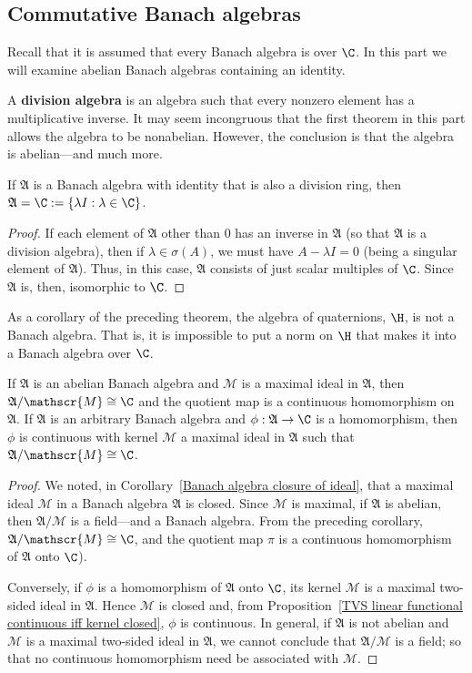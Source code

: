 \subsection{Commutative Banach algebras}
Recall that it is assumed that every Banach algebra is over $\C$. In this part we will examine abelian Banach algebras containing an identity.\par
A \textbf{division algebra} is an algebra such that every nonzero element has a multiplicative inverse. It may seem incongruous that the first theorem in this part allows the algebra to be nonabelian. However, the conclusion is that the algebra is abelian---and much more.
\begin{theorem}
If $\mathfrak{A}$ is a Banach algebra with identity that is also a division ring, then $\mathfrak{A}=\C:=\{\lambda I:\lambda\in\C\}$.
\end{theorem}
\begin{proof}
If each element of $\mathfrak{A}$ other than $0$ has an inverse in $\mathfrak{A}$ (so that $\mathfrak{A}$ is a division algebra), then if $\lambda\in\sigma(A)$, we must have $A-\lambda I=0$ (being a singular element of $\mathfrak{A}$). Thus, in this case, $\mathfrak{A}$ consists of just scalar multiples of $\C$. Since $\mathfrak{A}$ is, then, isomorphic to $\C$.
\end{proof}
As a corollary of the preceding theorem, the algebra of quaternions, $\H$, is not a Banach algebra. That is, it is impossible to put a norm on $\H$ that makes it into a Banach algebra over $\C$.
\begin{proposition}\label{Banach algebran abelian maximal ideal}
If $\mathfrak{A}$ is an abelian Banach algebra and $\mathscr{M}$ is a maximal ideal in $\mathfrak{A}$, then $\mathfrak{A}/\mathscr{M}\cong\C$ and the quotient map is a continuous homomorphism on $\mathfrak{A}$. If $\mathfrak{A}$ is an arbitrary Banach algebra and $\phi:\mathfrak{A}\to\C$ is a homomorphism, then $\phi$ is continuous with kernel $\mathscr{M}$ a maximal ideal in $\mathfrak{A}$ such that $\mathfrak{A}/\mathscr{M}\cong\C$.
\end{proposition}
\begin{proof}
We noted, in Corollary~\ref{Banach algebra closure of ideal}, that a maximal ideal $\mathscr{M}$ in a Banach algebra $\mathfrak{A}$ is closed. Since $\mathscr{M}$ is maximal, if $\mathfrak{A}$ is abelian, then $\mathfrak{A}/\mathscr{M}$ is a field---and a Banach algebra. From the preceding corollary, $\mathfrak{A}/\mathscr{M}\cong\C$, and the quotient map $\pi$ is a continuous homomorphism of $\mathfrak{A}$ onto $\C$).\par
Conversely, if $\phi$ is a homomorphism of $\mathfrak{A}$ onto $\C$, its kernel $\mathscr{M}$ is a maximal two-sided ideal in $\mathfrak{A}$. Hence $\mathscr{M}$ is closed and, from Proposition~\ref{TVS linear functional continuous iff kernel closed}, $\phi$ is continuous. In general, if $\mathfrak{A}$ is not abelian and $\mathscr{M}$ is a maximal two-sided ideal in $\mathfrak{A}$, we cannot conclude that $\mathfrak{A}/\mathscr{M}$ is a field; so that no continuous homomorphism need be associated with $\mathscr{M}$.
\end{proof}
